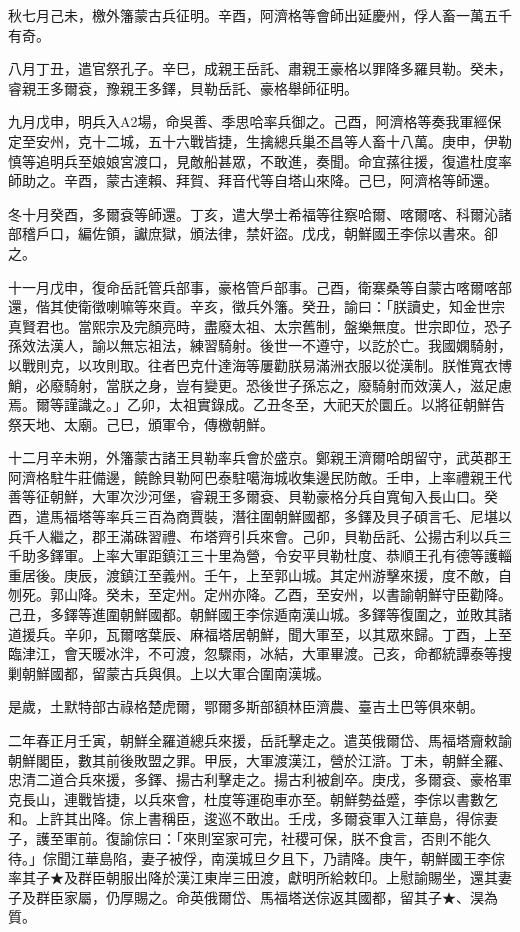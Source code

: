 \begin{pinyinscope}
秋七月己未，檄外籓蒙古兵征明。辛酉，阿濟格等會師出延慶州，俘人畜一萬五千有奇。

八月丁丑，遣官祭孔子。辛巳，成親王岳託、肅親王豪格以罪降多羅貝勒。癸未，睿親王多爾袞，豫親王多鐸，貝勒岳託、豪格舉師征明。

九月戊申，明兵入A2場，命吳善、季思哈率兵御之。己酉，阿濟格等奏我軍經保定至安州，克十二城，五十六戰皆捷，生擒總兵巢丕昌等人畜十八萬。庚申，伊勒慎等追明兵至娘娘宮渡口，見敵船甚眾，不敢進，奏聞。命宜蓀往援，復遣杜度率師助之。辛酉，蒙古達賴、拜賀、拜音代等自塔山來降。己巳，阿濟格等師還。

冬十月癸酉，多爾袞等師還。丁亥，遣大學士希福等往察哈爾、喀爾喀、科爾沁諸部稽戶口，編佐領，讞庶獄，頒法律，禁奸盜。戊戌，朝鮮國王李倧以書來。卻之。

十一月戊申，復命岳託管兵部事，豪格管戶部事。己酉，衛寨桑等自蒙古喀爾喀部還，偕其使衛徵喇嘛等來貢。辛亥，徵兵外籓。癸丑，諭曰：「朕讀史，知金世宗真賢君也。當熙宗及完顏亮時，盡廢太祖、太宗舊制，盤樂無度。世宗即位，恐子孫效法漢人，諭以無忘祖法，練習騎射。後世一不遵守，以訖於亡。我國嫻騎射，以戰則克，以攻則取。往者巴克什達海等屢勸朕易滿洲衣服以從漢制。朕惟寬衣博鮹，必廢騎射，當朕之身，豈有變更。恐後世子孫忘之，廢騎射而效漢人，滋足慮焉。爾等謹識之。」乙卯，太祖實錄成。乙丑冬至，大祀天於圜丘。以將征朝鮮告祭天地、太廟。己巳，頒軍令，傳檄朝鮮。

十二月辛未朔，外籓蒙古諸王貝勒率兵會於盛京。鄭親王濟爾哈朗留守，武英郡王阿濟格駐牛莊備邊，饒餘貝勒阿巴泰駐噶海城收集邊民防敵。壬申，上率禮親王代善等征朝鮮，大軍次沙河堡，睿親王多爾袞、貝勒豪格分兵自寬甸入長山口。癸酉，遣馬福塔等率兵三百為商賈裝，潛往圍朝鮮國都，多鐸及貝子碩言乇、尼堪以兵千人繼之，郡王滿硃習禮、布塔齊引兵來會。己卯，貝勒岳託、公揚古利以兵三千助多鐸軍。上率大軍距鎮江三十里為營，令安平貝勒杜度、恭順王孔有德等護輜重居後。庚辰，渡鎮江至義州。壬午，上至郭山城。其定州游擊來援，度不敵，自刎死。郭山降。癸未，至定州。定州亦降。乙酉，至安州，以書諭朝鮮守臣勸降。己丑，多鐸等進圍朝鮮國都。朝鮮國王李倧遁南漢山城。多鐸等復圍之，並敗其諸道援兵。辛卯，瓦爾喀葉辰、麻福塔居朝鮮，聞大軍至，以其眾來歸。丁酉，上至臨津江，會天暖冰泮，不可渡，忽驟雨，冰結，大軍畢渡。己亥，命都統譚泰等搜剿朝鮮國都，留蒙古兵與俱。上以大軍合圍南漢城。

是歲，土默特部古祿格楚虎爾，鄂爾多斯部額林臣濟農、臺吉土巴等俱來朝。

二年春正月壬寅，朝鮮全羅道總兵來援，岳託擊走之。遣英俄爾岱、馬福塔齎敕諭朝鮮閣臣，數其前後敗盟之罪。甲辰，大軍渡漢江，營於江滸。丁未，朝鮮全羅、忠清二道合兵來援，多鐸、揚古利擊走之。揚古利被創卒。庚戌，多爾袞、豪格軍克長山，連戰皆捷，以兵來會，杜度等運砲車亦至。朝鮮勢益蹙，李倧以書數乞和。上許其出降。倧上書稱臣，逡巡不敢出。壬戌，多爾袞軍入江華島，得倧妻子，護至軍前。復諭倧曰：「來則室家可完，社稷可保，朕不食言，否則不能久待。」倧聞江華島陷，妻子被俘，南漢城旦夕且下，乃請降。庚午，朝鮮國王李倧率其子★及群臣朝服出降於漢江東岸三田渡，獻明所給敕印。上慰諭賜坐，還其妻子及群臣家屬，仍厚賜之。命英俄爾岱、馬福塔送倧返其國都，留其子★、淏為質。


\end{pinyinscope}
